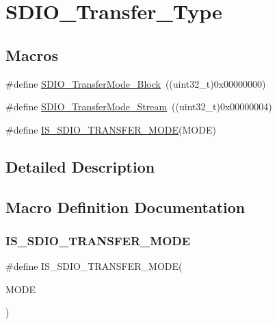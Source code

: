 \hypertarget{group___s_d_i_o___transfer___type}{}\section{S\+D\+I\+O\+\_\+\+Transfer\+\_\+\+Type}
\label{group___s_d_i_o___transfer___type}
\subsection*{Macros}
\begin{DoxyCompactItemize}
\item 
\#define \mbox{\hyperlink{group___s_d_i_o___transfer___type_ga5b54ada18cc4072ceff1d98ee4b69972}{S\+D\+I\+O\+\_\+\+Transfer\+Mode\+\_\+\+Block}}~((uint32\+\_\+t)0x00000000)
\item 
\#define \mbox{\hyperlink{group___s_d_i_o___transfer___type_gadd0cafe0a80e6b6cc5c22d838cbb2e28}{S\+D\+I\+O\+\_\+\+Transfer\+Mode\+\_\+\+Stream}}~((uint32\+\_\+t)0x00000004)
\item 
\#define \mbox{\hyperlink{group___s_d_i_o___transfer___type_gaf7565ea93f9ed01558bdc9ad80dac763}{I\+S\+\_\+\+S\+D\+I\+O\+\_\+\+T\+R\+A\+N\+S\+F\+E\+R\+\_\+\+M\+O\+DE}}(M\+O\+DE)
\end{DoxyCompactItemize}


\subsection{Detailed Description}


\subsection{Macro Definition Documentation}
\mbox{\label{group___s_d_i_o___transfer___type_gaf7565ea93f9ed01558bdc9ad80dac763}} 
\subsubsection{\texorpdfstring{IS\_SDIO\_TRANSFER\_MODE}{IS\_SDIO\_TRANSFER\_MODE}}
{\footnotesize\ttfamily \#define I\+S\+\_\+\+S\+D\+I\+O\+\_\+\+T\+R\+A\+N\+S\+F\+E\+R\+\_\+\+M\+O\+DE(\begin{DoxyParamCaption}\item[{}]{M\+O\+DE }\end{DoxyParamCaption})}

